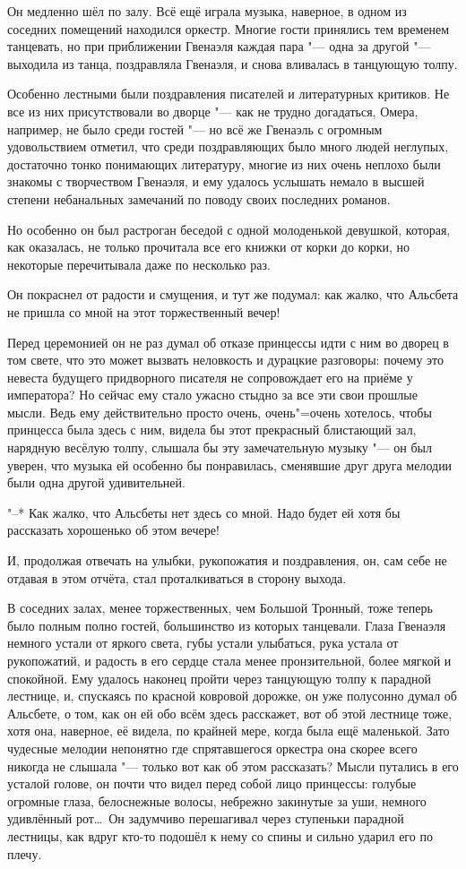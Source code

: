 Он медленно шёл по залу.
Всё ещё играла музыка, наверное, в одном из соседних помещений находился
оркестр.
Многие гости принялись тем временем танцевать, но при приближении Гвенаэля
каждая пара "--- одна за другой "--- выходила из танца, поздравляла Гвенаэля, и
снова вливалась в танцующую толпу.

Особенно лестными были поздравления писателей и литературных критиков.
Не все из них присутствовали во дворце "--- как не трудно догадаться, Омера,
например, не было среди гостей "--- но всё же Гвенаэль с огромным удовольствием
отметил, что среди поздравляющих было много людей неглупых, достаточно тонко
понимающих литературу, многие из них очень неплохо были знакомы с творчеством
Гвенаэля, и ему удалось услышать немало в высшей степени небанальных замечаний
по поводу своих последних романов.

Но особенно он был растроган беседой с одной молоденькой девушкой, которая, как
оказалась, не только прочитала все его книжки от корки до корки, но некоторые
перечитывала даже по несколько раз.

Он покраснел от радости и смущения, и тут же подумал: как жалко, что Альсбета не
пришла со мной на этот торжественный вечер!

Перед церемонией он не раз думал об отказе принцессы идти с ним во дворец в том
свете, что это может вызвать неловкость и дурацкие разговоры: почему это невеста
будущего придворного писателя не сопровождает его на приёме у императора?
Но сейчас ему стало ужасно стыдно за все эти свои прошлые мысли.
Ведь ему действительно просто очень, очень"=очень хотелось, чтобы принцесса была
здесь с ним, видела бы этот прекрасный блистающий зал, нарядную весёлую толпу,
слышала бы эту замечательную музыку "--- он был уверен, что музыка ей особенно
бы понравилась, сменявшие друг друга мелодии были одна другой удивительней.

"--* Как жалко, что Альсбеты нет здесь со мной.
Надо будет ей хотя бы рассказать хорошенько об этом вечере!

И, продолжая отвечать на улыбки, рукопожатия и поздравления, он, сам себе не
отдавая в этом отчёта, стал проталкиваться в сторону выхода.

В соседних залах, менее торжественных, чем Большой Тронный, тоже теперь было
полным полно гостей, большинство из которых танцевали.
Глаза Гвенаэля немного устали от яркого света, губы устали улыбаться, рука
устала от рукопожатий, и радость в его сердце стала менее пронзительной, более
мягкой и спокойной.
Ему удалось наконец пройти через танцующую толпу к парадной лестнице, и,
спускаясь по красной ковровой дорожке, он уже полусонно думал об Альсбете, о
том, как он ей обо всём здесь расскажет, вот об этой лестнице тоже, хотя она,
наверное, её видела, по крайней мере, когда была ещё маленькой.
Зато чудесные мелодии непонятно где спрятавшегося оркестра она скорее всего
никогда не слышала "--- только вот как об этом рассказать?
Мысли путались в его усталой голове, он почти что видел перед собой лицо
принцессы: голубые огромные глаза, белоснежные волосы, небрежно закинутые за
уши, немного удивлённый рот\ldots\
Он задумчиво перешагивал через ступеньки парадной лестницы, как вдруг кто-то
подошёл к нему со спины и сильно ударил его по плечу.

